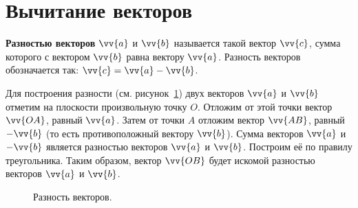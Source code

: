 \section{Вычитание векторов}
\textbf{Разностью векторов} $\vv{a}$ и $\vv{b}$ называется такой вектор $\vv{c}$,
сумма которого с вектором $\vv{b}$ равна вектору $\vv{a}$.
Разность векторов обозначается так: $\vv{c} = \vv{a}-\vv{b}$.

Для построения разности (см. рисунок~\ref{pic:raznost})
двух векторов $\vv{a}$ и $\vv{b}$ отметим на плоскости
произвольную точку $O$. Отложим от этой точки вектор $\vv{OA}$, равный $\vv{a}$.
Затем от точки $A$ отложим вектор $\vv{AB}$, равный $-\vv{b}$ (то есть противоположный
вектору $\vv{b}$). Сумма векторов $\vv{a}$ и $-\vv{b}$ является разностью векторов
$\vv{a}$ и $\vv{b}$. Построим её по правилу треугольника. Таким образом,
вектор $\vv{OB}$ будет искомой разностью векторов $\vv{a}$ и $\vv{b}$.

\begin{figure}[h]
  \centering
  \caption{\small Разность векторов.}\label{pic:raznost}
\end{figure}

